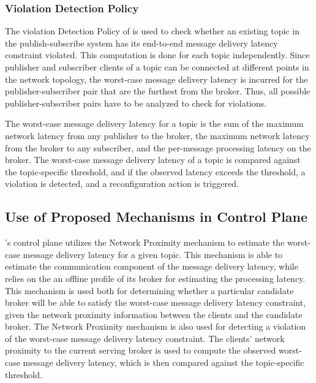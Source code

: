\subsubsection{Violation Detection Policy}
The violation Detection Policy of \epulsar{} is used to check whether an existing topic in the publish-subscribe system has its end-to-end message delivery latency constraint violated. This computation is done for each topic independently. Since publisher and subscriber clients of a topic can be connected at different points in the network topology, the worst-case message delivery latency is incurred for the publisher-subscriber pair that are the furthest from the broker. Thus, all possible publisher-subscriber pairs have to be analyzed to check for violations.
\par The worst-case message delivery latency for a topic is the sum of the maximum network latency from any publisher to the broker, the maximum network latency from the broker to any subscriber, and the per-message processing latency on the broker. The worst-case message delivery latency of a topic is compared against the topic-specific threshold, and if the observed latency exceeds the threshold, a violation is detected, and a reconfiguration action is triggered.
\subsection{Use of Proposed Mechanisms in Control Plane}
\epulsar{}'s control plane utilizes the Network Proximity mechanism to estimate the worst-case message delivery latency for a given topic. This mechanism is able to estimate the communication component of the message delivery latency, while \epulsar{} relies on the an offline profile of its broker for estimating the processing latency. This mechanism is used both for determining whether a particular candidate broker will be able to satisfy the worst-case message delivery latency constraint, given the network proximity information between the clients and the candidate broker. The Network Proximity mechanism is also used for detecting a violation of the worst-case message delivery latency constraint. The clients' network proximity to the current serving broker is used to compute the observed worst-case message delivery latency, which is then compared against the topic-specific threshold.

